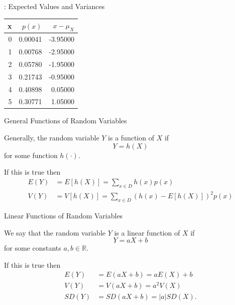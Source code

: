 \begin{frame}
\begin{block}{\examplectd: Expected Values and Variances}
\begin{table}[ht]
\centering
\begin{tabular}{rrr}
  \hline
x & $p(x)$ & $x - \mu_X$ \\ 
  \hline
     0 & 0.00041 & -3.95000 \\ 
       1 & 0.00768 & -2.95000 \\ 
       2 & 0.05780 & -1.95000 \\ 
       3 & 0.21743 & -0.95000 \\ 
       4 & 0.40898 & 0.05000 \\ 
       5 & 0.30771 & 1.05000 \\ 
   \hline
\end{tabular}
\end{table}

\end{block}
\end{frame}

\begin{frame}
  \begin{block}{General Functions of Random Variables}

    Generally, the random variable $Y$ is a function of $X$ if
    \[
      Y=h(X)
    \]
    for some function $h(\cdot)$. 

    \medskip

    If this is true then
    \begin{align*}
      E(Y)&=E[h(X)]=\sum_{x \in D}h(x)p(x)\\
      V(Y)&=V[h(X)]=\sum_{x \in D}\left(h(x) - E[h(X)]\right)^2 p(x)
    \end{align*}
  \end{block}
\end{frame}

\begin{frame}
  \begin{block}{Linear Functions of Random Variables}

    We say that the random variable $Y$ is a linear function of $X$ if
    \[
      Y=a X + b
    \]
    for some constants $a,b \in \mathbb R$.

    \medskip

    If this is true then
    \begin{align*}
      E(Y)&=E(aX + b)=aE(X) + b\\
      V(Y)&=V(aX + b)=a^2V(X)\\
      SD(Y)&=SD(aX + b)=|a|SD(X).
    \end{align*}
  \end{block}
\end{frame}

